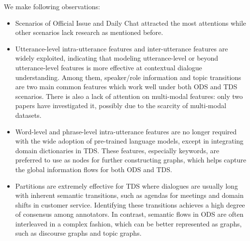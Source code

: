 We make following observations:
\begin{itemize}
	\item Scenarios of Official Issue and Daily Chat attracted the most 
	attentions while other scenarios lack research as mentioned before. 
	
		\item Utterance-level intra-utterance features and inter-utterance 
	features are widely exploited, indicating that modeling utterance-level or 
	beyond utterance-level features is more effective at contextual dialogue 
	understanding. Among them, speaker/role information and topic transitions are 
	two main common features which work well 
	under both ODS and TDS scenarios. There is also a lack of attention on 
	multi-modal features: only two papers have investigated it, possibly due to the scarcity of multi-modal datasets.
		\item Word-level and phrase-level intra-utterance features are no longer
	required with the wide adoption of pre-trained language models, except in
	integrating domain dictionaries in TDS. These features, especially keywords,
	are preferred to use as nodes for further constructing graphs, which helps 
	capture the global information flows for both ODS and TDS. 
		\item Partitions are extremely effective for TDS where dialogues 
	are usually long with inherent semantic transitions, such as agendas for meetings and domain shifts in customer service. 
	Identifying these transitions achieves a high degree of consensus among annotators. 
	In contrast, semantic flows in ODS are often interleaved in a complex fashion,
	which can be better represented as graphs, such as discourse graphs and topic graphs.


\end{itemize}
